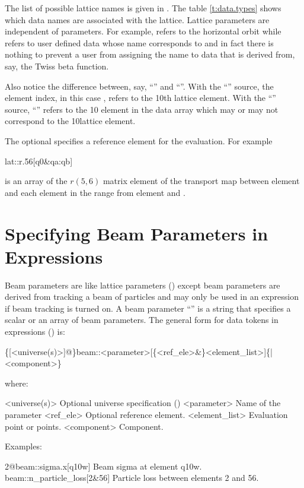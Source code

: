 The list of possible lattice  names is given in . The table
\ref{t:data.types} shows which data names are associated with the lattice. Lattice parameters are
independent of  parameters. For example,  refers to the horizontal orbit
while  refers to user defined data whose name corresponds to  and in
fact there is nothing to prevent a user from assigning the name  to data that is derived
from, say, the Twiss beta function.

Also notice the difference between, say, ``'' and
``''. With the ``'' source, the element index, in this case ,
refers to the 10th lattice element. With the ``'' source, ``'' refers to the 10\Th
element in the  data array which may or may not correspond to the 10\Th lattice element.

The optional  specifies a reference
element for the evaluation. For example
\begin{example}
  lat::r.56[q0\&qa:qb]
\end{example}  
is an array of the $r(5,6)$ matrix element of the transport map between element  and each
element in the range from element  and .

\section{Specifying Beam Parameters in Expressions}
\label{s:beam.token}

Beam parameters are like lattice parameters () except beam parameters are derived
from tracking a beam of particles and may only be used in an expression if beam tracking is turned
on.  A beam parameter ``'' is a string that specifies a scalar or an array of beam
parameters. The general form for data tokens in expressions () is:
\begin{example}
  \{[<universe(s)>]@\}beam::<parameter>[\{<ref_ele>&\}<element_list>]\{|<component>\}
\end{example}
where:
\begin{example}
  <universe(s)>       Optional universe specification ()
  <parameter>         Name of the parameter
  <ref_ele>           Optional reference element.
  <element_list>      Evaluation point or points.
  <component>         Component. 
\end{example}
Examples:
\begin{example}
  2@beam::sigma.x[q10w]           Beam sigma at element q10w.
  beam::n_particle_loss[2&56]     Particle loss between elements 2 and 56.
\end{example}

